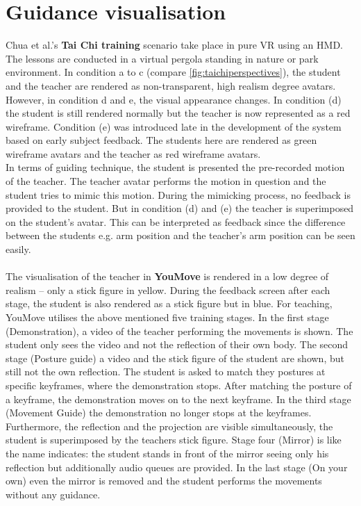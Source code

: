 \section{Guidance visualisation}
Chua et al.'s \textbf{Tai Chi training} scenario take place in pure VR using an HMD. The lessons are conducted in a virtual pergola standing in nature or park environment. In condition a to c (compare \ref{fig:taichiperspectives}), the student and the teacher are rendered as non-transparent, high realism degree avatars. However, in condition d and e, the visual appearance changes. In condition (d) the student is still rendered normally but the teacher is now represented as a red wireframe. Condition (e) was introduced late in the development of the system based on early subject feedback. The students here are rendered as green wireframe avatars and the teacher as red wireframe avatars.\\
In terms of guiding technique, the student is presented the pre-recorded motion of the teacher. The teacher avatar performs the motion in question and the student tries to mimic this motion. During the mimicking process, no feedback is provided to the student. But in condition (d) and (e) the teacher is superimposed on the student's avatar. This can be interpreted as feedback since the difference between the students e.g. arm position and the teacher's arm position can be seen easily.\\ \\
The visualisation of the teacher in \textbf{YouMove} \cite{Anderson2013a} is rendered in a low degree of realism \--- only a stick figure in yellow. During the feedback screen after each stage, the student is also rendered as a stick figure but in blue. For teaching, YouMove utilises the above mentioned five training stages. In the first stage (Demonstration), a video of the teacher performing the movements is shown. The student only sees the video and not the reflection of their own body. The second stage (Posture guide) a video and the stick figure of the student are shown, but still not the own reflection. The student is asked to match they postures at specific keyframes, where the demonstration stops. After matching the posture of a keyframe, the demonstration moves on to the next keyframe. In the third stage (Movement Guide) the demonstration no longer stops at the keyframes. Furthermore, the reflection and the projection are visible simultaneously, the student is superimposed by the teachers stick figure. Stage four (Mirror) is like the name indicates: the student stands in front of the mirror seeing only his reflection but additionally audio queues are provided. In the last stage (On your own) even the mirror is removed and the student performs the movements without any guidance.\\
